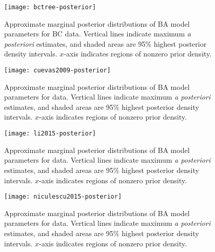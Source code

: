 \clearpage

\begin{figure}[ht]
  \texttt{[image: bctree-posterior]}
  \caption[
      Approximate marginal posterior distributions of BA model parameters for
      BC data.
  ]
  {
      Approximate marginal posterior distributions of BA model parameters for
      BC data. Vertical lines indicate maximum \textit{a posteriori} estimates,
      and shaded areas are 95\% highest posterior density intervals. $x$-axis
      indicates regions of nonzero prior density.
  }
  \label{fig:bctree}
\end{figure}

\begin{figure}[ht]
  \texttt{[image: cuevas2009-posterior]}
  \caption[
      Approximate marginal posterior distributions of BA model parameters for
      \textcite{cuevas2009hiv} data. 
  ]{
      Approximate marginal posterior distributions of BA model parameters for
      \textcite{cuevas2009hiv} data. Vertical lines indicate maximum \textit{a
      posteriori} estimates, and shaded areas are 95\% highest posterior
      density intervals. $x$-axis indicates regions of nonzero prior density.
  }
  \label{fig:cuevas}
\end{figure}

\begin{figure}[ht]
  \texttt{[image: li2015-posterior]}
  \caption[
      Approximate marginal posterior distributions of BA model parameters for
      \textcite{li2015hiv} data. 
  ]{
      Approximate marginal posterior distributions of BA model parameters for
      \textcite{li2015hiv} data. Vertical lines indicate maximum \textit{a
      posteriori} estimates, and shaded areas are 95\% highest posterior
      density intervals. $x$-axis indicates regions of nonzero prior density.
  }
  \label{fig:li}
\end{figure}

\begin{figure}[ht]
  \texttt{[image: niculescu2015-posterior]}
  \caption[
      Approximate marginal posterior distributions of BA model parameters for
      \textcite{niculescu2015recent} data.
  ]{
      Approximate marginal posterior distributions of BA model parameters for
      \textcite{niculescu2015recent} data. Vertical lines indicate maximum
      \textit{a posteriori} estimates, and shaded areas are 95\% highest
      posterior density intervals. $x$-axis indicates regions of nonzero prior
      density.
  }
  \label{fig:niculescu}
\end{figure}

